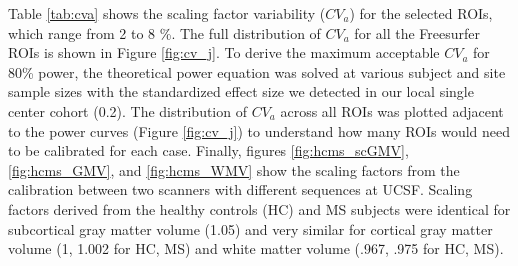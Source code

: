 Table \ref{tab:cva} shows the scaling factor variability ($CV_{a}$) for the selected ROIs, which range from 2 to 8 \%. The full distribution of $CV_{a}$ for all the Freesurfer ROIs is shown in Figure \ref{fig:cv_j}. To derive the maximum acceptable $CV_{a}$ for 80\% power, the theoretical power equation was solved at various subject and site sample sizes with the standardized effect size we detected in our local single center cohort (0.2). The distribution of $CV_{a}$ across all ROIs was plotted adjacent to the power curves (Figure \ref{fig:cv_j}) to understand how many ROIs would need to be calibrated for each case. Finally, figures \ref{fig:hcms_scGMV}, \ref{fig:hcms_GMV}, and \ref{fig:hcms_WMV} show the scaling factors from the calibration between two scanners with different sequences at UCSF. Scaling factors derived from the healthy controls (HC) and MS subjects were identical for subcortical gray matter volume (1.05) and very similar for cortical gray matter volume (1, 1.002 for HC, MS) and white matter volume (.967, .975 for HC, MS).